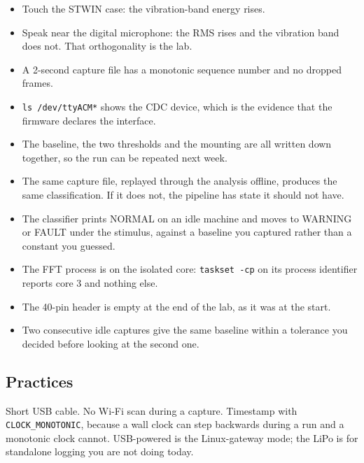 \begin{itemize}
\item Touch the STWIN case: the vibration-band energy rises.
\item Speak near the digital microphone: the RMS rises and the vibration band does not. That orthogonality is the lab.
\item A 2-second capture file has a monotonic sequence number and no dropped frames.
\item \texttt{ls /dev/ttyACM*} shows the CDC device, which is the evidence that the firmware declares the interface.
\item The baseline, the two thresholds and the mounting are all written down together, so the run can be repeated next week.
\item The same capture file, replayed through the analysis offline, produces the same classification. If it does not, the pipeline has state it should not have.
\item The classifier prints NORMAL on an idle machine and moves to WARNING or FAULT under the stimulus, against a baseline you captured rather than a constant you guessed.
\item The FFT process is on the isolated core: \texttt{taskset -cp} on its process identifier reports core 3 and nothing else.
\item The 40-pin header is empty at the end of the lab, as it was at the start.
\item Two consecutive idle captures give the same baseline within a tolerance you decided before looking at the second one.
\end{itemize}

\subsection*{Practices}

Short USB cable. No Wi-Fi scan during a capture. Timestamp with \texttt{CLOCK\_MONOTONIC}, because a wall clock can step backwards during a run and a monotonic clock cannot. USB-powered is the Linux-gateway mode; the LiPo is for standalone logging you are not doing today.

